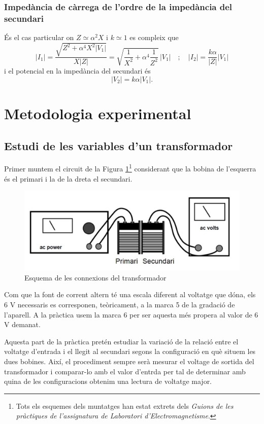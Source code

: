\documentclass[a4paper,10.5pt]{report}
\begin{document}
\subsubsection{Impedància de càrrega de l'ordre de la impedància del secundari}
És el cas particular on $Z \simeq \alpha^2X$ i $k \simeq 1$ es compleix que
\begin{equation}
	|I_1| = \frac{\sqrt{Z^2 + \alpha^4 X^2 |V_1|}}{X |Z|} = \sqrt{ \frac{1}{X^2} + \alpha^4 \frac{1}{Z^2} } \, |V_1| 
	\quad ; \quad |I_2| = \frac{k \alpha}{|Z|} |V_1|
	\label{eq4:23}
\end{equation}
i el potencial en la impedància del secundari és
\begin{equation}
	|V_2| = k \alpha |V_1|.
	\label{eq4:24}
\end{equation}

\section{Metodologia experimental}
\subsection{Estudi de les variables d'un transformador}
Primer muntem el circuit de la Figura \ref{fig4:1}\footnote{Tots els esquemes dels muntatges han estat extrets dels \textit{Guions de les pràctiques de l'assignatura de Laboratori d'Electromagnetisme}\cite{ref3}.} considerant que la bobina de l'esquerra és el primari i la de la dreta el secundari.

\begin{figure}[h]
	\centering
	\includegraphics[width=0.38\linewidth]{screenshot007}
	\caption{Esquema de les connexions del transformador}
	\label{fig4:1}
\end{figure}

Com que la font de corrent altern té una escala diferent al voltatge que dóna, els 6 V necessaris es corresponen, teòricament, a la marca 5 de la gradació de l'aparell. A la pràctica usem la marca 6 per ser aquesta més propera al valor de 6 V demanat.

Aquesta part de la pràctica pretén estudiar la variació de la relació entre el voltatge d'entrada i el llegit al secundari segons la configuració en què situem les dues bobines. Així, el procediment sempre serà mesurar el voltage de sortida del transformador i comparar-lo amb el valor d'entrda per tal de determinar amb quina de les configuracions obtenim una lectura de voltatge major.
\end{document}
